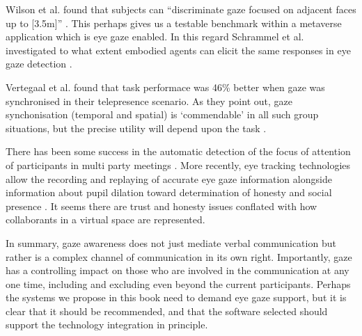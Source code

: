 Wilson et al. found that subjects can ``discriminate gaze focused on adjacent faces up to [3.5m]'' \cite{Wilson2000}. This perhaps gives us a testable benchmark within a metaverse application which is eye gaze enabled. In this regard Schrammel et al. investigated to what extent embodied agents can elicit the same responses in eye gaze detection \cite{Schrammel2007}.\par       
Vertegaal et al. found that task performace was 46\% better when gaze was synchronised in their telepresence scenario. As they point out, gaze synchonisation (temporal and spatial) is `commendable' in all such group situations, but the precise utility will depend upon the task \cite{Vertegaal2002}.\par
There has been some success in the automatic detection of the focus of attention of participants in multi party meetings \cite{Stiefelhagen2001, Stiefelhagen2002}.  More recently, eye tracking technologies allow the recording and replaying of accurate eye gaze information \cite{Steptoe2009} alongside information about pupil dilation toward determination of honesty and social presence \cite{Steptoe2010}. It seems there are trust and honesty issues conflated with how collaborants in a virtual space are represented.\par               
In summary, gaze awareness does not just mediate verbal communication but rather is a complex channel of communication in its own right. Importantly, gaze has a controlling impact on those who are involved in the communication at any one time, including and excluding even beyond the current participants. Perhaps the systems we propose in this book need to demand eye gaze support, but it is clear that it should be recommended, and that the software selected should support the technology integration in principle.\par
